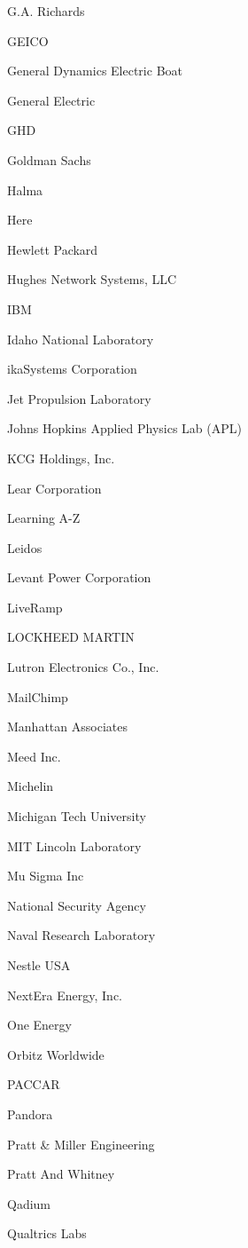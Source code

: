 \documentclass[twoside]{article}
\begin{document}
\begin{center}
\begin{multicols}{5}
\begin{FlushLeft}
\begin{compactitem}
\item G.A. Richards
\item GEICO
\item General Dynamics Electric Boat
\item General Electric
\item GHD
\item Goldman Sachs
\item Halma
\item Here
\item Hewlett Packard
\item Hughes Network Systems, LLC
\item IBM
\item Idaho National Laboratory
\item ikaSystems Corporation
\item Jet Propulsion Laboratory
\item Johns Hopkins Applied Physics Lab (APL)
\item KCG Holdings, Inc.
\item Lear Corporation
\item Learning A-Z
\item Leidos
\item Levant Power Corporation
\item LiveRamp
\item LOCKHEED MARTIN
\item Lutron Electronics Co., Inc.
\item MailChimp
\item Manhattan Associates
\item Meed Inc.
\item Michelin
\item Michigan Tech University
\item MIT Lincoln Laboratory
\item Mu Sigma Inc
\item National Security Agency
\item Naval Research Laboratory
\item Nestle USA
\item NextEra Energy, Inc.
\item One Energy
\item Orbitz Worldwide
\item PACCAR
\item Pandora
\item Pratt \& Miller Engineering
\item Pratt And Whitney
\item Qadium
\item Qualtrics Labs

\end{compactitem}
\end{FlushLeft}
\end{multicols}
\end{center}
\end{document}
